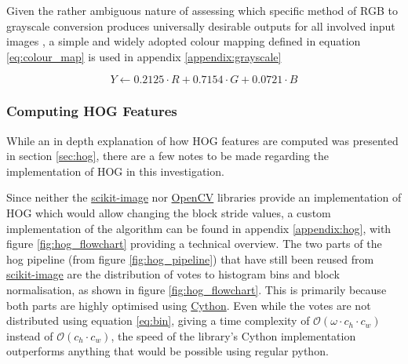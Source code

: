 Given the rather ambiguous nature of assessing which specific method of RGB to grayscale conversion produces universally desirable outputs for all involved input images \cite{madk_2008_perceptual}, a simple and widely adopted colour mapping defined in equation \ref{eq:colour_map} is used in appendix \ref{appendix:grayscale}

\begin{equation}\label{eq:colour_map}
    Y \leftarrow 0.2125 \cdot R + 0.7154 \cdot G + 0.0721 \cdot B
\end{equation}

\subsubsection{Computing HOG Features}

While an in depth explanation of how HOG features are computed was presented in section \ref{sec:hog}, there are a few notes to be made regarding the implementation of HOG in this investigation.

Since neither the \href{https://scikit-image.org/}{scikit-image} nor \href{https://opencv.org/}{OpenCV} libraries provide an implementation of HOG which would allow changing the block stride values, a custom implementation of the algorithm can be found in appendix \ref{appendix:hog}, with figure \ref{fig:hog_flowchart} providing a technical overview. The two parts of the hog pipeline (from figure \ref{fig:hog_pipeline}) that have still been reused from \href{https://scikit-image.org/}{scikit-image} are the distribution of votes to histogram bins and block normalisation, as shown in figure \ref{fig:hog_flowchart}. This is primarily because both parts are highly optimised using \href{https://cython.org/}{Cython}. Even while the votes are not distributed using equation \ref{eq:bin}, giving a time complexity of $\mathcal{O}(\omega \cdot c_h \cdot c_w)$ instead of $\mathcal{O}(c_h \cdot c_w)$, the speed of the library's Cython implementation outperforms anything that would be possible using regular python.

